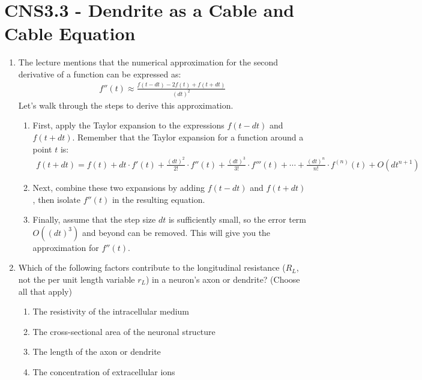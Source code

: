 \documentclass[11pt,letterpaper]{article}
\begin{document}
\pagebreak

\section{CNS3.3 - Dendrite as a Cable and Cable Equation}
\begin{enumerate}
    \item The lecture mentions that the numerical approximation for the second derivative of a function can be expressed as:
    \begin{align*}
        f''(t) \approx \frac{f(t-dt) - 2f(t) + f(t+dt)}{(dt)^2}
    \end{align*} Let's walk through the steps to derive this approximation.
    \begin{enumerate}
        \item First, apply the Taylor expansion to the expressions $f(t-dt)$ and $f(t+dt)$. Remember that the Taylor expansion for a function around a point $t$ is:
        \begin{align*}
            f(t + dt) = f(t) + dt \cdot f'(t) + \frac{(dt)^2}{2!} \cdot f''(t) + \frac{(dt)^3}{3!} \cdot f'''(t) + \cdots + \frac{(dt)^n}{n!} \cdot f^{(n)}(t) + O(dt^{n+1})
        \end{align*}
        \vspace{2 cm}
        \item Next, combine these two expansions by adding $f(t-dt)$ and $f(t+dt)$, then isolate $f''(t)$ in the resulting equation.
        \vspace{5 cm}
        \item Finally, assume that the step size $dt$ is sufficiently small, so the error term $O((dt)^3)$ and beyond can be removed. This will give you the approximation for $f''(t)$.
        \vspace{2 cm}
    \end{enumerate}

    \item Which of the following factors contribute to the longitudinal resistance ($R_L$, not the per unit length variable $r_L$) in a neuron's axon or dendrite? (Choose all that apply)
    \begin{enumerate}
        \item The resistivity of the intracellular medium
        \item The cross-sectional area of the neuronal structure
        \item The length of the axon or dendrite
        \item The concentration of extracellular ions
    \end{enumerate}
\end{enumerate}
\end{document}
